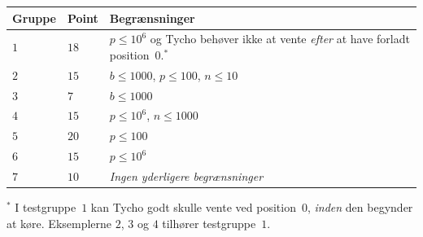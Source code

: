 \medskip
\begin{tabular}{lll}
Gruppe & Point & Begrænsninger \\\hline
$1$ & $18$ & $p\leq 10^6$ og Tycho behøver ikke at vente \emph{efter} at have forladt position~$0$.$^*$ \\ %
$2$ & $15$ & $b\leq 1000$, $p\leq 100$, $n\leq 10$ \\
$3$ & $7$ & $b\leq 1000$ \\
$4$ & $15$ & $p\leq 10^6$, $n\leq 1000$\\
$5$ & $20$ & $p\leq 100$\\
$6$ & $15$ & $p\leq 10^6$\\
$7$ & $10$ & \emph{Ingen yderligere begrænsninger}
\end{tabular}

\medskip
\noindent $^*$ I testgruppe~$1$ kan Tycho godt skulle vente ved position~$0$, \emph{inden} den begynder at køre.
Eksemplerne $2$, $3$ og $4$ tilhører testgruppe~$1$.





